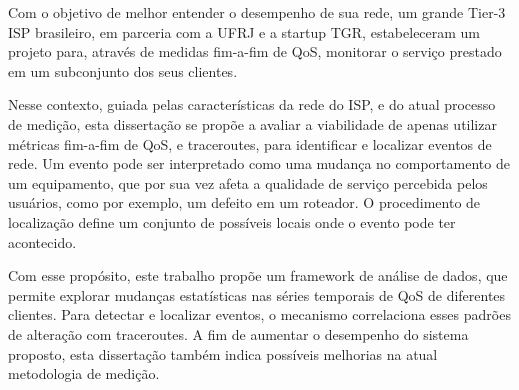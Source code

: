 Com o objetivo de melhor entender o desempenho de sua rede,
um grande Tier-3 ISP brasileiro, em parceria com a UFRJ e a startup TGR,
estabeleceram um projeto para, atrav\'es de medidas fim-a-fim de QoS,
monitorar o servi\c{c}o prestado em um subconjunto dos seus clientes.

Nesse contexto, guiada pelas caracter\'isticas da rede do ISP, e do atual
processo de medi\c{c}\~ao, esta disserta\c{c}\~ao se prop\~oe a
avaliar a viabilidade de apenas utilizar m\'etricas fim-a-fim de QoS, e
traceroutes, para identificar e localizar eventos de rede. Um evento pode ser
interpretado como uma mudan\c{c}a no comportamento de um equipamento, que por
sua vez afeta a qualidade de servi\c{c}o percebida pelos usu\'arios,
como por exemplo, um defeito em um roteador.
O procedimento de localiza\c{c}\~ao define um conjunto de poss\'iveis
locais onde o evento pode ter acontecido.

Com esse prop\'osito, este trabalho prop\~oe um framework de an\'alise de dados,
que permite explorar mudan\c{c}as estat\'isticas nas s\'eries temporais de QoS
de diferentes clientes. Para detectar e localizar eventos, o mecanismo
correlaciona esses padr\~oes de altera\c{c}\~ao com traceroutes.
A fim de aumentar o
desempenho do sistema proposto, esta disserta\c{c}\~ao tamb\'em indica
poss\'iveis melhorias na atual metodologia de medi\c{c}\~ao.
